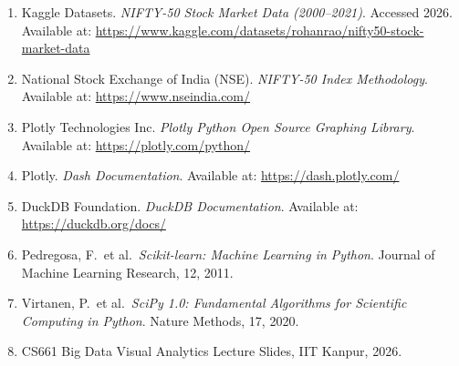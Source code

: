 \documentclass[14pt,a4paper]{extreport}
\begin{document}
\begin{enumerate}
    \item Kaggle Datasets. \textit{NIFTY-50 Stock Market Data (2000--2021)}.
        Accessed 2026. Available at:
        \url{https://www.kaggle.com/datasets/rohanrao/nifty50-stock-market-data}
    \item National Stock Exchange of India (NSE). \textit{NIFTY-50 Index
        Methodology}. Available at: \url{https://www.nseindia.com/}
    \item Plotly Technologies Inc. \textit{Plotly Python Open Source
        Graphing Library}. Available at: \url{https://plotly.com/python/}
    \item Plotly. \textit{Dash Documentation}. Available at:
        \url{https://dash.plotly.com/}
    \item DuckDB Foundation. \textit{DuckDB Documentation}. Available at:
        \url{https://duckdb.org/docs/}
    \item Pedregosa, F.\ et al.\ \textit{Scikit-learn: Machine Learning in
        Python}. Journal of Machine Learning Research, 12, 2011.
    \item Virtanen, P.\ et al.\ \textit{SciPy 1.0: Fundamental Algorithms
        for Scientific Computing in Python}. Nature Methods, 17, 2020.
    \item CS661 Big Data Visual Analytics Lecture Slides, IIT Kanpur, 2026.
\end{enumerate}
\end{document}
